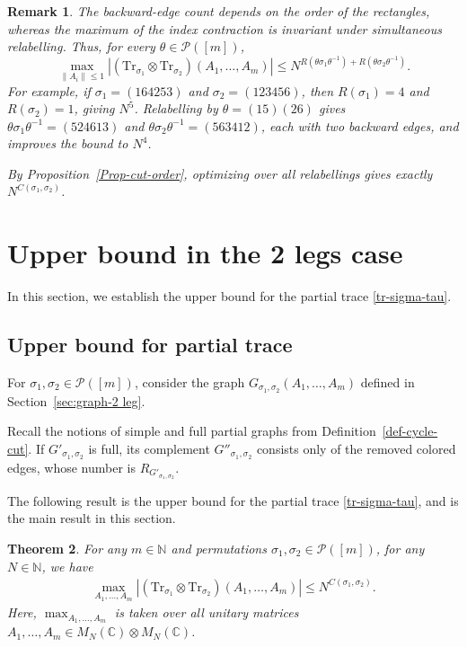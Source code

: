 \documentclass[10pt,a4paper]{amsart}
\numberwithin{equation}{section}
\theoremstyle{plain}
\newtheorem{theorem}{Theorem}[section]
\newtheorem{remark}[theorem]{Remark}
\def\bN{\mathbb N}
\def\bC{\mathbb C}
\def\cP{\mathcal P}
\def\Tr{\mathrm {Tr}}
\begin{document}
\begin{remark}
The backward-edge count depends on the order of the rectangles, whereas the maximum of the index contraction is invariant under simultaneous relabelling. Thus, for every $\theta\in\cP([m])$,
\[
\max_{\|A_i\|\le1}|(\Tr_{\sigma_1}\otimes\Tr_{\sigma_2})(A_1,\ldots,A_m)|
\le N^{R(\theta\sigma_1\theta^{-1})+R(\theta\sigma_2\theta^{-1})}.
\]
For example, if $\sigma_1=(164253)$ and $\sigma_2=(123456)$, then $R(\sigma_1)=4$ and $R(\sigma_2)=1$, giving $N^5$. Relabelling by $\theta=(15)(26)$ gives $\theta\sigma_1\theta^{-1}=(524613)$ and $\theta\sigma_2\theta^{-1}=(563412)$, each with two backward edges, and improves the bound to $N^4$.

By Proposition~\ref{Prop-cut-order}, optimizing over all relabellings gives exactly $N^{C(\sigma_1,\sigma_2)}$.
\end{remark}

\section{Upper bound in the 2 legs case} \label{sec:upper}

In this section, we establish the upper bound for the partial trace \eqref{tr-sigma-tau}.

\subsection{Upper bound for partial trace}

For $\sigma_1,\sigma_2\in\cP([m])$, consider the graph $G_{\sigma_1,\sigma_2}(A_1,\ldots,A_m)$ defined in Section~\ref{sec:graph-2 leg}.

Recall the notions of simple and full partial graphs from Definition~\ref{def-cycle-cut}. If $G'_{\sigma_1,\sigma_2}$ is full, its complement $G''_{\sigma_1,\sigma_2}$ consists only of the removed colored edges, whose number is $R_{G'_{\sigma_1,\sigma_2}}$.

The following result is the upper bound for the partial trace \eqref{tr-sigma-tau}, and is the main result in this section.

\begin{theorem} \label{Thm-upper}
For any $m\in\bN$ and permutations $\sigma_1,\sigma_2 \in \cP([m])$, for any $N \in \bN$, we have
\begin{align*}
    \max_{A_1,\ldots,A_m} \left| \left( \Tr_{\sigma_1} \otimes \Tr_{\sigma_2} \right) \left( A_1, \ldots, A_m \right) \right|
    \le N^{C(\sigma_1,\sigma_2)}.
\end{align*}
Here, $\max_{A_1,\ldots,A_m}$ is taken over all unitary matrices $A_1,\ldots,A_m \in M_N (\bC) \otimes M_N(\bC)$.
\end{theorem}
\end{document}
